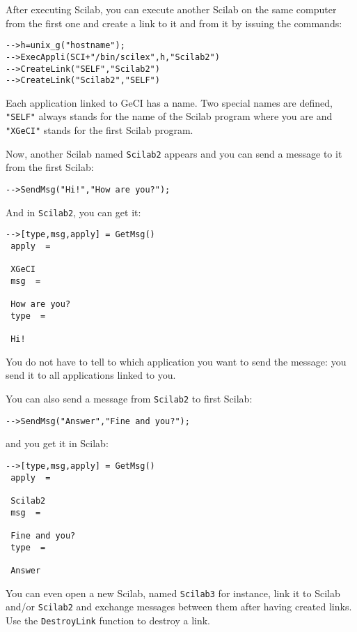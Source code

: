 \documentclass[11pt]{article}
\newcommand{\func}[1]{\texttt{#1}}
\newcommand{\T}[1]{\texttt{#1}}
\begin{document}
After executing Scilab, you can execute another Scilab on the same
computer from the first one and create a link to it and from it by
issuing the commands:
 
\begin{verbatim}
-->h=unix_g("hostname");
-->ExecAppli(SCI+"/bin/scilex",h,"Scilab2")
-->CreateLink("SELF","Scilab2")
-->CreateLink("Scilab2","SELF")
\end{verbatim}

Each application linked to GeCI has a name. Two special names are defined,
\T{"SELF"} always stands for the name of the Scilab program where you
are and \T{"XGeCI"} stands for the first Scilab program.

Now, another Scilab named \T{Scilab2} appears and you can send a
message to it from the first Scilab:

\begin{verbatim}
-->SendMsg("Hi!","How are you?");
\end{verbatim}

And in \T{Scilab2}, you can get it:

\begin{verbatim}
-->[type,msg,apply] = GetMsg()
 apply  =
 
 XGeCI   
 msg  =
 
 How are you?   
 type  =
 
 Hi!   
\end{verbatim}

You do not have to tell to which application you want to send the
message: you send it to all applications linked to you.

You can also send a message from \T{Scilab2} to first Scilab:

\begin{verbatim}
-->SendMsg("Answer","Fine and you?");
\end{verbatim}

and you get it in Scilab:

\begin{verbatim}
-->[type,msg,apply] = GetMsg()
 apply  =
 
 Scilab2   
 msg  =
 
 Fine and you?   
 type  =
 
 Answer   
\end{verbatim}

You can even open a new Scilab, named \T{Scilab3} for instance, link it
to Scilab and/or \T{Scilab2} and exchange messages between them after
having created links. Use the \func{DestroyLink} function to destroy a
link.
\end{document}
